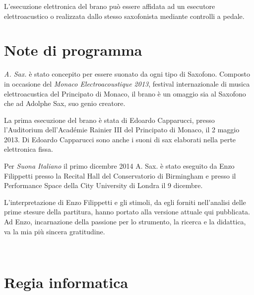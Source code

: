 \documentclass[10pt, a4paper, twoside]{book}
\begin{document}
\begin{multicols}{2}
L'esecuzione elettronica del brano può essere affidata ad un esecutore elettroacustico o realizzata dallo stesso saxofonista mediante controlli a pedale.

\end{multicols}

\vfill

\begin{center}{
	\fontsize{35pt}{50pt}}
\end{center}

\vfill

\section*{Note di programma}

\begin{multicols}{2}



\emph{A. Sax.} è stato concepito per essere suonato da ogni tipo di Saxofono. Composto in occasione del \emph{Monaco Electroacoustique 2013}, festival internazionale di musica elettroacustica del Principato di Monaco, il brano è un omaggio sia al Saxofono che ad Adolphe Sax, suo genio creatore.

La prima esecuzione del brano è stata di Edoardo Capparucci, presso l'Auditorium dell'{\scaps Académie Rainier III} del Principato di Monaco, il 2 maggio 2013. Di Edoardo Capparucci  sono anche i suoni di sax elaborati nella perte elettronica fissa. 

Per \emph{Suona Italiano} il primo dicembre 2014 {\scaps A. Sax.} è stato eseguito da Enzo Filippetti presso la {\scaps Recital Hall} del {\scaps Conservatorio di Birmingham} e presso il {\scaps Performance Space} della {\scaps City University} di Londra il 9 dicembre. 

L'interpretazione di Enzo Filippetti e gli stimoli, da egli forniti nell'analisi delle prime stesure della partitura, hanno portato alla versione attuale qui pubblicata. Ad Enzo, incarnazione della passione per lo strumento, la ricerca e la didattica, va la mia più sincera gratitudine. 

\vfill
~
\vfill

\end{multicols}

\clearpage

\section*{Regia informatica}
\end{document}
